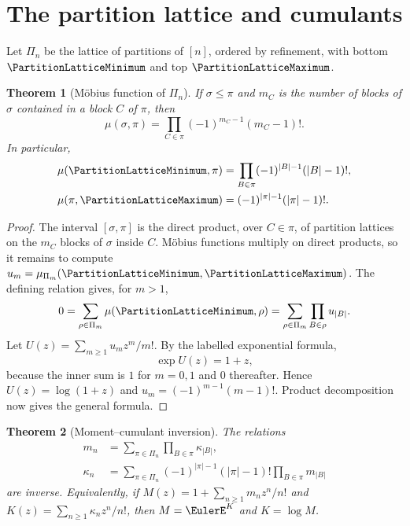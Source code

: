 \documentclass[11pt,a4paper,oneside,openany]{book}
\newtheorem{theorem}{Theorem}[chapter]
\theoremstyle{definition}
\theoremstyle{remark}
\begin{document}
\section{The partition lattice and cumulants}

Let $\Pi_n$ be the lattice of partitions of $[n]$, ordered by refinement,
with bottom $\PartitionLatticeMinimum$ and top $\PartitionLatticeMaximum$.

\begin{theorem}[Möbius function of $\Pi_n$]
\label{thm:merged-partition-mobius}
If $\sigma\leq\pi$ and $m_C$ is the number of blocks of $\sigma$ contained in
a block $C$ of $\pi$, then
\begin{equation}
 \mu(\sigma,\pi)=\prod_{C\in\pi}(-1)^{m_C-1}(m_C-1)!.              \label{eq:merged-partition-mobius}
\end{equation}
In particular,
\begin{align}
 \mu(\PartitionLatticeMinimum,\pi)&=\prod_{B\in\pi}(-1)^{|B|-1}(|B|-1)!,         \label{eq:merged-partition-mobius-bottom}\\
 \mu(\pi,\PartitionLatticeMaximum)&=(-1)^{|\pi|-1}(|\pi|-1)!.                    \label{eq:merged-partition-mobius-top}
\end{align}
\end{theorem}

\begin{proof}
The interval $[\sigma,\pi]$ is the direct product, over $C\in\pi$, of
partition lattices on the $m_C$ blocks of $\sigma$ inside $C$.  Möbius
functions multiply on direct products, so it remains to compute
$u_m=\mu_{\Pi_m}(\PartitionLatticeMinimum,\PartitionLatticeMaximum)$.  The defining relation gives, for
$m>1$,
\[
 0=\sum_{\rho\in\Pi_m}\mu(\PartitionLatticeMinimum,\rho)
  =\sum_{\rho\in\Pi_m}\prod_{B\in\rho}u_{|B|}.
\]
Let $U(z)=\sum_{m\geq1}u_mz^m/m!$.  By the labelled exponential formula,
\[
 \exp U(z)=1+z,
\]
because the inner sum is $1$ for $m=0,1$ and $0$ thereafter.  Hence
$U(z)=\log(1+z)$ and $u_m=(-1)^{m-1}(m-1)!$.  Product decomposition now gives
the general formula.
\end{proof}

\begin{theorem}[Moment--cumulant inversion]
\label{thm:merged-moment-cumulant}
The relations
\begin{align}
 m_n&=\sum_{\pi\in\Pi_n}\prod_{B\in\pi}\kappa_{|B|},               \label{eq:merged-moment-cumulant-forward}\\
 \kappa_n&=\sum_{\pi\in\Pi_n}(-1)^{|\pi|-1}(|\pi|-1)!
                 \prod_{B\in\pi}m_{|B|}                            \label{eq:merged-moment-cumulant-backward}
\end{align}
are inverse.  Equivalently, if
$M(z)=1+\sum_{n\geq1}m_nz^n/n!$ and
$K(z)=\sum_{n\geq1}\kappa_nz^n/n!$, then $M=\EulerE^K$ and $K=\log M$.
\end{theorem}
\end{document}
